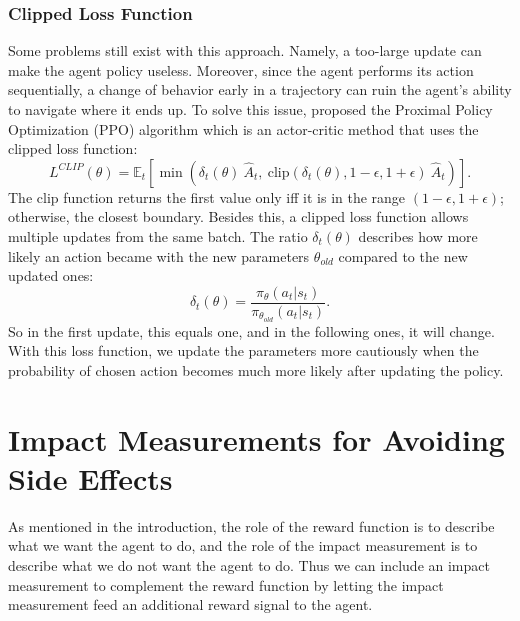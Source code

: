 \documentclass[12pt,A4]{report}
\theoremstyle{definition}
\begin{document}
\subsubsection{Clipped Loss Function}
Some problems still exist with this approach. Namely, a too-large update can make the agent policy useless. Moreover, since the agent performs its action sequentially, a change of behavior early in a trajectory can ruin the agent's ability to navigate where it ends up. To solve this issue, \citet{schulman2017proximal} proposed the Proximal Policy Optimization (PPO) algorithm which is an actor-critic method that uses the clipped loss function:
\[L^{CLIP}(\theta) = \mathbb{E}_t \left [ \min(\delta_t(\theta) \ \hat{A}_t,\ 
\text{clip}(\delta_t(\theta), 1 - \epsilon, 1 + \epsilon) \ \hat{A}_t) \right ]. \]
The clip function returns the first value only iff it is in the range $(1-\epsilon, 1+\epsilon)$; otherwise, the closest boundary. Besides this,  a clipped loss function allows multiple updates from the same batch. The ratio $\delta_t(\theta)$ describes how more likely an action became with the new parameters $\theta_{old}$ compared to the new updated ones:
\[ \delta_t(\theta) = \frac{\pi_\theta(a_t| s_t)}{\pi_{\theta_{old}}(a_t|s_t)}. \]
So in the first update, this equals one, and in the following ones, it will change. With this loss function, we update the parameters more cautiously when the probability of chosen action becomes much more likely after updating the policy.


\section{Impact Measurements for Avoiding Side Effects}

As mentioned in the introduction, the role of the reward function is to describe what we want the agent to do, and the role of the impact measurement is to describe what we do not want the agent to do. Thus we can include an impact measurement to complement the reward function by letting the impact measurement feed an additional reward signal to the agent.
\end{document}
